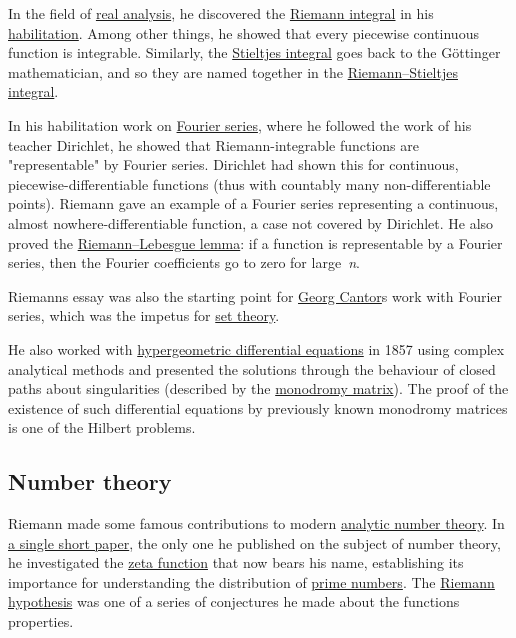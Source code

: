 In the field of \href{https://en.wikipedia.org/wiki/Real_analysis}{real analysis}, he discovered the \href{https://en.wikipedia.org/wiki/Riemann_integral}{Riemann integral} in his \href{https://en.wikipedia.org/wiki/Habilitation}{habilitation}. Among other things, he showed that every piecewise continuous function is integrable. Similarly, the \href{https://en.wikipedia.org/wiki/Stieltjes_integral}{Stieltjes integral} goes back to the Göttinger mathematician, and so they are named together in the \href{https://en.wikipedia.org/wiki/Riemann–Stieltjes_integral}{Riemann--Stieltjes integral}.

In his habilitation work on \href{https://en.wikipedia.org/wiki/Fourier_series}{Fourier series}, where he followed the work of his teacher Dirichlet, he showed that Riemann-integrable functions are "representable" by Fourier series. Dirichlet had shown this for continuous, piecewise-differentiable functions (thus with countably many non-differentiable points). Riemann gave an example of a Fourier series representing a continuous, almost nowhere-differentiable function, a case not covered by Dirichlet. He also proved the \href{https://en.wikipedia.org/wiki/Riemann–Lebesgue_lemma}{Riemann--Lebesgue lemma}: if a function is representable by a Fourier series, then the Fourier coefficients go to zero for large{~}\emph{n}.

Riemann\textquotesingle s essay was also the starting point for \href{https://en.wikipedia.org/wiki/Georg_Cantor}{Georg Cantor}\textquotesingle s work with Fourier series, which was the impetus for \href{https://en.wikipedia.org/wiki/Set_theory}{set theory}.

He also worked with \href{https://en.wikipedia.org/wiki/Hypergeometric_differential_equations}{hypergeometric differential equations} in 1857 using complex analytical methods and presented the solutions through the behaviour of closed paths about singularities (described by the \href{https://en.wikipedia.org/wiki/Monodromy_matrix}{monodromy matrix}). The proof of the existence of such differential equations by previously known monodromy matrices is one of the Hilbert problems.


\subsection{Number theory}\label{Number_theory}

Riemann made some famous contributions to modern \href{https://en.wikipedia.org/wiki/Analytic_number_theory}{analytic number theory}. In \href{https://en.wikipedia.org/wiki/On_the_Number_of_Primes_Less_Than_a_Given_Magnitude}{a single short paper}, the only one he published on the subject of number theory, he investigated the \href{https://en.wikipedia.org/wiki/Riemann_zeta_function}{zeta function} that now bears his name, establishing its importance for understanding the distribution of \href{https://en.wikipedia.org/wiki/Prime_number}{prime numbers}. The \href{https://en.wikipedia.org/wiki/Riemann_hypothesis}{Riemann hypothesis} was one of a series of conjectures he made about the function\textquotesingle s properties.

